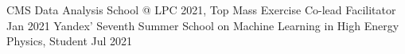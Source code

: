  




CMS Data Analysis School @ LPC 2021, Top Mass Exercise Co-lead Facilitator \hfill Jan 2021
Yandex' Seventh Summer School on Machine Learning in High Energy Physics, Student \hfill Jul 2021 \\
